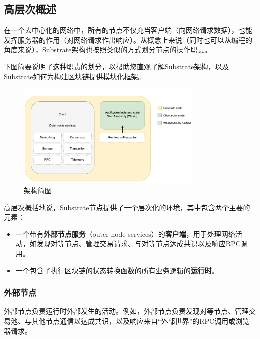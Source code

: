 \hypertarget{ux9ad8ux5c42ux6b21ux6982ux8ff0}{%
\subsection{高层次概述}\label{ux9ad8ux5c42ux6b21ux6982ux8ff0}}

在一个去中心化的网络中，所有的节点不仅充当客户端（向网络请求数据），也能发挥服务器的作用（对网络请求作出响应）。从概念上来说（同时也可以从编程的角度来说），Substrate架构也按照类似的方式划分节点的操作职责。

下图简要说明了这种职责的划分，以帮助您直观了解Substrate架构，以及Substrate如何为构建区块链提供模块化框架。

\begin{figure}[htbp]
  \centering
  \includegraphics[width=0.8\textwidth]{images/simplified-architecture.png}
  \caption{架构简图}\label{架构简图} %
\end{figure}

高层次概括地说，Substrate节点提供了一个层次化的环境，其中包含两个主要的元素：

\begin{itemize}
\item
  一个带有\textbf{外部节点服务}（outer node
  services）的\textbf{客户端}，用于处理网络活动，如发现对等节点、管理交易请求、与对等节点达成共识以及响应RPC调用。
\item
  一个包含了执行区块链的状态转换函数的所有业务逻辑的\textbf{运行时}。
\end{itemize}

\hypertarget{ux5916ux90e8ux8282ux70b9}{%
\subsubsection{外部节点}\label{ux5916ux90e8ux8282ux70b9}}

外部节点负责运行时外部发生的活动。例如，外部节点负责发现对等节点、管理交易池、与其他节点通信以达成共识，以及响应来自``外部世界''的RPC调用或浏览器请求。

